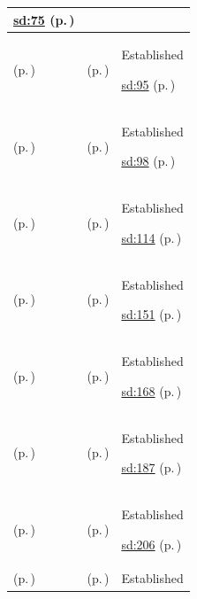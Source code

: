 \begin{longtable}{|>{\raggedright\arraybackslash}p{0.27\TableWidth}|>{\raggedright\arraybackslash}p{0.27\TableWidth}|>{\raggedright\arraybackslash}p{0.46\TableWidth}|}
 \hyperref[rad:sd:71]{sd:75} (p.\,\pageref{rad:sd:71})\\\hline
\nameref{function:bind-ed-triage-assessment} (p.\,\pageref{function:bind-ed-triage-assessment}) & \nameref{feature:feat-sd-05} (p.\,\pageref{feature:feat-sd-05}) & Established

 \hyperref[rad:sd:91]{sd:95} (p.\,\pageref{rad:sd:91})\\\hline
\nameref{function:provide-emergency-lhr-summary} (p.\,\pageref{function:provide-emergency-lhr-summary}) & \nameref{feature:feat-sd-06} (p.\,\pageref{feature:feat-sd-06}) & Established

 \hyperref[rad:sd:91]{sd:98} (p.\,\pageref{rad:sd:91})\\\hline
\nameref{function:consolidate-inpatient-clinical-round-feed} (p.\,\pageref{function:consolidate-inpatient-clinical-round-feed}) & \nameref{feature:feat-sd-07} (p.\,\pageref{feature:feat-sd-07}) & Established

 \hyperref[rad:sd:110]{sd:114} (p.\,\pageref{rad:sd:110})\\\hline
\nameref{function:project-longitudinal-medication-history} (p.\,\pageref{function:project-longitudinal-medication-history}) & \nameref{feature:feat-sd-11} (p.\,\pageref{feature:feat-sd-11}) & Established

 \hyperref[rad:sd:147]{sd:151} (p.\,\pageref{rad:sd:147})\\\hline
\nameref{function:syndicate-immunisation-record} (p.\,\pageref{function:syndicate-immunisation-record}) & \nameref{feature:feat-sd-13} (p.\,\pageref{feature:feat-sd-13}) & Established

 \hyperref[rad:sd:164]{sd:168} (p.\,\pageref{rad:sd:164})\\\hline
\nameref{function:synchronize-community-visit-record} (p.\,\pageref{function:synchronize-community-visit-record}) & \nameref{feature:feat-sd-15} (p.\,\pageref{feature:feat-sd-15}) & Established

 \hyperref[rad:sd:183]{sd:187} (p.\,\pageref{rad:sd:183})\\\hline
\nameref{function:provide-outreach-visit-context} (p.\,\pageref{function:provide-outreach-visit-context}) & \nameref{feature:feat-sd-17} (p.\,\pageref{feature:feat-sd-17}) & Established

 \hyperref[rad:sd:202]{sd:206} (p.\,\pageref{rad:sd:202})\\\hline
\nameref{function:reconcile-outreach-clinical-batch} (p.\,\pageref{function:reconcile-outreach-clinical-batch}) & \nameref{feature:feat-sd-18} (p.\,\pageref{feature:feat-sd-18}) & Established


\end{longtable}

